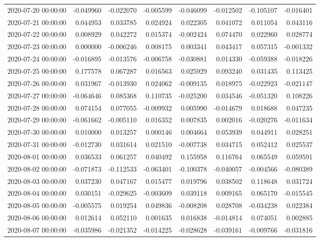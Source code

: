 \begin{tabular}{lrrrrrrr}
2020-07-20 00:00:00 & -0.049960 & -0.022070 & -0.005599 & -0.046099 & -0.012502 & -0.105107 & -0.016401 \\
2020-07-21 00:00:00 & 0.044953 & 0.033785 & 0.024924 & 0.022305 & 0.041072 & 0.011054 & 0.043116 \\
2020-07-22 00:00:00 & 0.008929 & 0.042272 & 0.015374 & -0.002424 & 0.074470 & 0.022960 & 0.028774 \\
2020-07-23 00:00:00 & 0.000000 & -0.006246 & 0.008175 & 0.003341 & 0.043417 & 0.057315 & -0.001332 \\
2020-07-24 00:00:00 & -0.016895 & -0.013576 & -0.006758 & -0.030881 & 0.014330 & -0.059388 & -0.018226 \\
2020-07-25 00:00:00 & 0.177578 & 0.067287 & 0.016563 & 0.025929 & 0.093240 & 0.031435 & 0.113425 \\
2020-07-26 00:00:00 & 0.031967 & -0.013930 & 0.024062 & -0.009135 & 0.018975 & -0.022923 & -0.021147 \\
2020-07-27 00:00:00 & -0.064646 & 0.085368 & 0.110735 & -0.025200 & 0.034546 & -0.051320 & 0.108226 \\
2020-07-28 00:00:00 & 0.074154 & 0.077055 & -0.009932 & 0.005990 & -0.014679 & 0.018688 & 0.047235 \\
2020-07-29 00:00:00 & -0.061662 & -0.005110 & 0.016352 & 0.007835 & 0.002016 & -0.020276 & -0.011634 \\
2020-07-30 00:00:00 & 0.010000 & 0.013257 & 0.000146 & 0.004664 & 0.053939 & 0.044911 & 0.028251 \\
2020-07-31 00:00:00 & -0.012730 & 0.031614 & 0.021510 & -0.007738 & 0.034715 & 0.052412 & 0.025537 \\
2020-08-01 00:00:00 & 0.036533 & 0.061257 & 0.040492 & 0.155958 & 0.116764 & 0.065549 & 0.059591 \\
2020-08-02 00:00:00 & -0.071873 & -0.112533 & -0.063401 & -0.100378 & -0.040057 & -0.004566 & -0.080389 \\
2020-08-03 00:00:00 & 0.037230 & 0.047167 & 0.015477 & 0.019796 & 0.038502 & 0.118648 & 0.031724 \\
2020-08-04 00:00:00 & 0.030151 & -0.029625 & -0.003609 & 0.039118 & 0.009165 & 0.065170 & -0.015545 \\
2020-08-05 00:00:00 & -0.005575 & 0.019254 & 0.049836 & -0.008208 & 0.028708 & -0.034238 & 0.022384 \\
2020-08-06 00:00:00 & 0.012614 & 0.052110 & 0.001635 & 0.016838 & -0.014814 & 0.074051 & 0.002885 \\
2020-08-07 00:00:00 & -0.035986 & -0.021352 & -0.014225 & -0.028628 & -0.039161 & -0.009766 & -0.031816 \\

\end{tabular}
